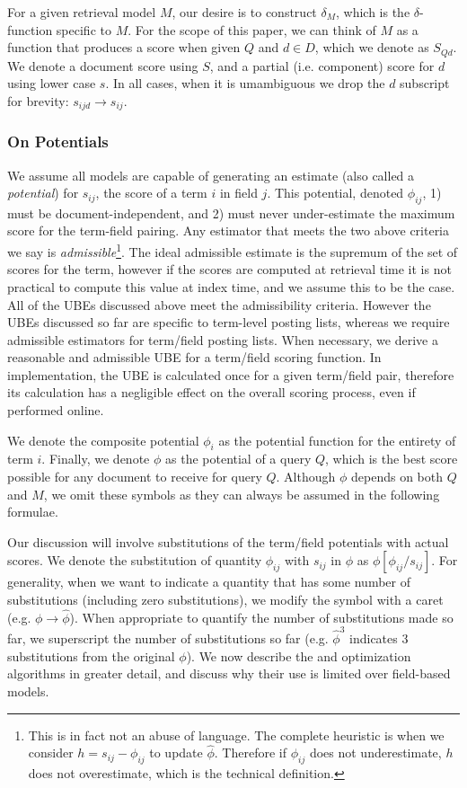 \documentclass{sig-alternate}
\newcommand{\method}[1]{{\sc{#1}}}
\begin{document}
For a given retrieval model $M$, our desire is to construct $\delta_{M}$, which is the $\delta$-function specific to $M$. For the scope of this paper, we can think of $M$ as a function that produces a score when given $Q$ and $d \in D$, which we denote as $S_{Qd}$. We denote a document score using $S$, and a partial (i.e. component) score for $d$ using lower case $s$. In all cases, when it is umambiguous we drop the $d$ subscript for brevity: $s_{ijd} \rightarrow s_{ij}$.
\subsubsection{On Potentials}
We assume all models are capable of generating an estimate (also called a \textit{potential}) for $s_{ij}$, the score of a term $i$ in field $j$. This potential, denoted $\phi_{ij}$, 1) must be document-independent, and 2) must never under-estimate the maximum score for the term-field pairing. Any estimator that meets the two above criteria we say is \textit{admissible}\footnote{This is in fact not an abuse of language. The complete heuristic is when we consider $h = s_{ij} - \phi_{ij}$ to update ${\hat \phi}$. Therefore if $\phi_{ij}$ does not underestimate, $h$ does not overestimate, which is the technical definition.}. The ideal admissible estimate is the supremum of the set of scores for the term, however if the scores are computed at retrieval time it is not practical to compute this value at index time, and we assume this to be the case. All of the UBEs discussed above meet the admissibility criteria. However the UBEs discussed so far are specific to term-level posting lists, whereas we require admissible estimators for term/field posting lists. When necessary, we derive a reasonable and admissible UBE for a term/field scoring function. In implementation, the UBE is calculated once for a given term/field pair, therefore its calculation has a negligible effect on the overall scoring process, even if performed online.

We denote the composite potential $\phi_{i}$ as the potential function for the entirety of term $i$. Finally, we denote $\phi$ as the potential of a query $Q$, which is the best score possible for any document to receive for query $Q$. Although $\phi$ depends on both $Q$ and $M$, we omit these symbols as they can always be assumed in the following formulae.

Our discussion will involve substitutions of the term/field potentials with actual scores. We denote the substitution of quantity $\phi_{ij}$ with $s_{ij}$ in $\phi$ as $\phi[\phi_{ij}/s_{ij}]$. For generality, when we want to indicate a quantity that has some number of substitutions (including zero substitutions), we modify the symbol with a caret (e.g. $\phi \rightarrow {\hat \phi}$). When appropriate to quantify the number of substitutions made so far, we superscript the number of substitutions so far (e.g. ${\hat \phi^{3}}$ indicates 3 substitutions from the original $\phi$). We now describe the \method{maxscore} and \method{wand} optimization algorithms in greater detail, and discuss why their use is limited over field-based models.
\end{document}
